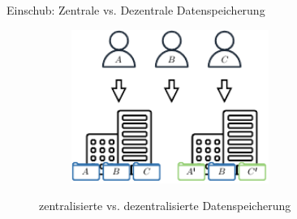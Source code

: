 \begin{frame}[c]{Einschub: Zentrale vs. Dezentrale Datenspeicherung}
    \vspace{1.5em}

    \begin{figure}
        \centering
        \begin{subfigure}{0.4\textwidth}
            \centering
            \includegraphics[height=5cm]{./assets/central.drawio.pdf}
        \end{subfigure}
        \hspace{2cm}

        \caption{zentralisierte vs. dezentralisierte Datenspeicherung}
    \end{figure}
\end{frame}


